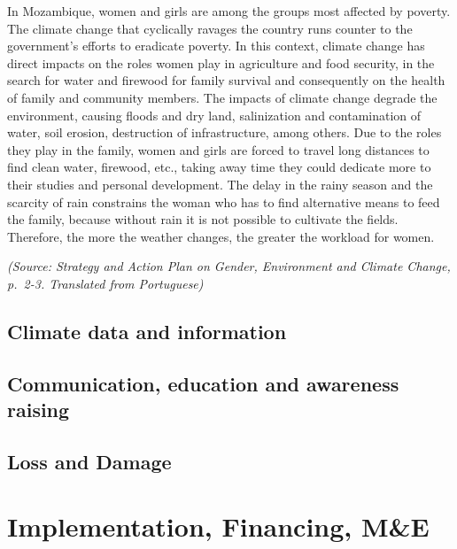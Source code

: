 \documentclass[
]{book}
\begin{document}
In Mozambique, women and girls are among the groups most affected by poverty. The climate change that cyclically ravages the country runs counter to the government's efforts to eradicate poverty. In this context, climate change has direct impacts on the roles women play in agriculture and food security, in the search for water and firewood for family survival and consequently on the health of family and community members. The impacts of climate change degrade the environment, causing floods and dry land, salinization and contamination of water, soil erosion, destruction of infrastructure, among others. Due to the roles they play in the family, women and girls are forced to travel long distances to find clean water, firewood, etc., taking away time they could dedicate more to their studies and personal development. The delay in the rainy season and the scarcity of rain constrains the woman who has to find alternative means to feed the family, because without rain it is not possible to cultivate the fields. Therefore, the more the weather changes, the greater the workload for women.

\emph{(Source: Strategy and Action Plan on Gender, Environment and Climate Change, p.~2-3. Translated from Portuguese)}

\hypertarget{climate-data-and-information}{%
\section{Climate data and information}\label{climate-data-and-information}}

\hypertarget{communication-education-and-awareness-raising}{%
\section{Communication, education and awareness raising}\label{communication-education-and-awareness-raising}}

\hypertarget{loss-and-damage}{%
\section{Loss and Damage}\label{loss-and-damage}}

\hypertarget{implementation-financing-me}{%
\chapter{Implementation, Financing, M\&E}\label{implementation-financing-me}}
\end{document}

